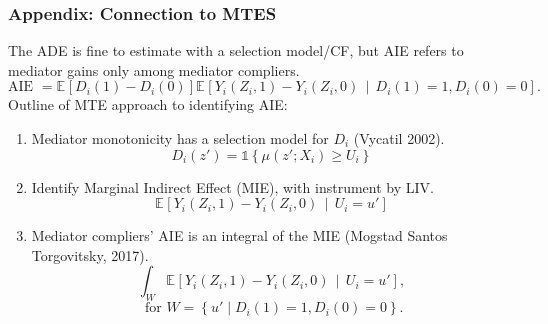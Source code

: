 \documentclass[dvipsnames,handout]{beamer} %
\renewcommand{\vec}[1]{\boldsymbol{\mathit{#1}}}                           %
\newcommand{\E}[2][]{\mathbb{E}_{#1} \left[ #2 \right]}                    %
\newcommand{\Egiven}[3][]{\mathbb{E}_{#1} \left[ #2 \, \middle\vert \, #3 \right]} %
\newcommand{\indicator}[1]{\mathds{1}\left\{ #1 \right\}}                  %
\begin{document}
\begin{frame}[noframenumbering]
    \frametitle{Appendix: Connection to MTES}
    \label{MTEs}
    The ADE is fine to estimate with a selection model/CF, but AIE refers to mediator gains only among mediator compliers.
    \[ \text{AIE } =
    \E{D_i(1) -D_i(0)} 
    \Egiven{Y_i(Z_i, 1) - Y_i(Z_i, 0)}{D_i(1) =1, D_i(0) = 0}. \]
    Outline of MTE approach to identifying AIE:
    \begin{enumerate}
        \item Mediator monotonicity has a selection model for $D_i$ (Vycatil 2002).
        \[ D_i(z') = \indicator{ \mu(z'; \vec X_i) \geq U_i } \]
        \item Identify Marginal Indirect Effect (MIE), with instrument by LIV.
        \[ \Egiven{Y_i(Z_i, 1) - Y_i(Z_i, 0)}{U_i = u'} \]
        \item Mediator compliers' AIE is an integral of the MIE (Mogstad Santos Torgovitsky, 2017). 
        \[ \int_{W} \Egiven{Y_i(Z_i, 1) - Y_i(Z_i, 0)}{U_i = u'}, \]
        \[ \text{ for } 
            W = \left\{ u' \; \Big| \; D_i(1) = 1, D_i(0) = 0 \right\}. \]
    \end{enumerate}
\end{frame}
\end{document}
